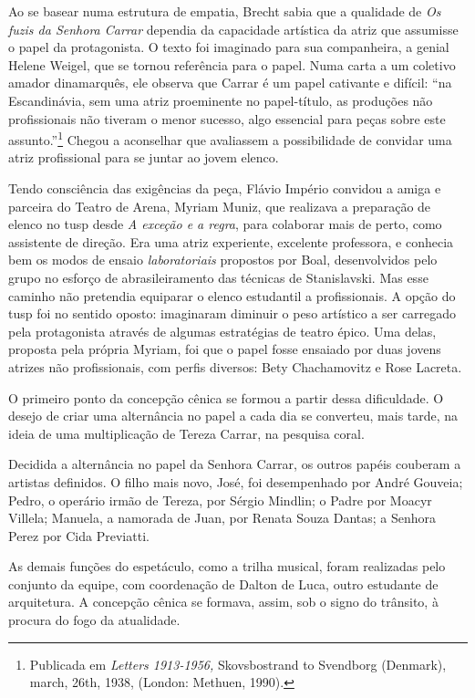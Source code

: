 Ao se basear numa estrutura de empatia, Brecht sabia que a qualidade de
{\it Os fuzis da Senhora Carrar} dependia da capacidade artística da
atriz que assumisse o papel da protagonista. O texto foi imaginado para
sua companheira, a genial Helene Weigel, que se tornou referência para o
papel. Numa carta a um coletivo amador dinamarquês, ele observa que
Carrar é um papel cativante e difícil: “na Escandinávia, sem uma atriz
proeminente no papel-título, as produções não profissionais não tiveram
o menor sucesso, algo essencial para peças sobre este
assunto.”\footnote{Publicada em {\it Letters 1913-1956,} Skovsbostrand
  to Svendborg (Denmark), march, 26th, 1938, (London: Methuen, 1990).}
Chegou a aconselhar que avaliassem a possibilidade de convidar uma atriz
profissional para se juntar ao jovem elenco.

Tendo consciência das exigências da peça, Flávio Império convidou a
amiga e parceira do Teatro de Arena, Myriam Muniz, que realizava a
preparação de elenco no {\sc tusp} desde {\it A exceção e a regra}, para
colaborar mais de perto, como assistente de direção. Era uma atriz
experiente, excelente professora, e conhecia bem os modos de ensaio
{\it laboratoriais} propostos por Boal, desenvolvidos pelo grupo no
esforço de abrasileiramento das técnicas de Stanislavski. Mas esse
caminho não pretendia equiparar o elenco estudantil a profissionais. A
opção do {\sc tusp} foi no sentido oposto: imaginaram diminuir o peso
artístico a ser carregado pela protagonista através de algumas
estratégias de teatro épico. Uma delas, proposta pela própria Myriam,
foi que o papel fosse ensaiado por duas jovens atrizes
não profissionais, com perfis diversos: Bety Chachamovitz e Rose
Lacreta.

O primeiro ponto da concepção cênica se formou a partir dessa
dificuldade. O desejo de criar uma alternância no papel a cada dia se
converteu, mais tarde, na ideia de uma multiplicação de Tereza Carrar,
na pesquisa coral.

Decidida a alternância no papel da Senhora Carrar, os outros papéis
couberam a artistas definidos. O filho mais novo, José, foi desempenhado
por André Gouveia; Pedro, o operário irmão de Tereza, por Sérgio
Mindlin; o Padre por Moacyr Villela; Manuela, a namorada de Juan, por
Renata Souza Dantas; a Senhora Perez por Cida Previatti.

As demais funções do espetáculo, como a trilha musical, foram realizadas
pelo conjunto da equipe, com coordenação de Dalton de Luca, outro
estudante de arquitetura. A concepção cênica se formava, assim, sob o
signo do trânsito, à procura do fogo da atualidade.

